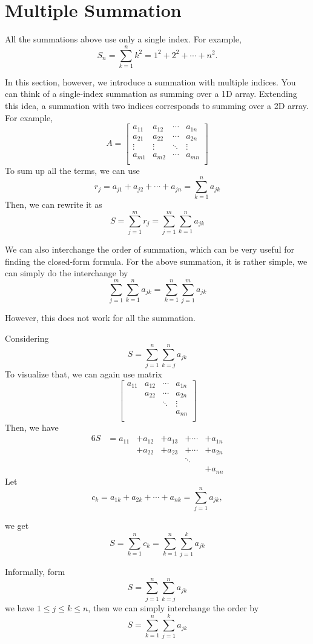 \newpage
\section{Multiple Summation}
All the summations above use only a single index. For example, 
\[
	S_n = \sum_{k = 1}^n k^2 = 1^2 + 2^2 + \cdots + n^2.
\]

In this section, however, we introduce a summation with multiple indices. You can think of a single-index summation as summing over a 1D array. Extending this idea, a summation with two indices corresponds to summing over a 2D array. For example,
\[
	A = \begin{bmatrix}
		a_{11} & a_{12} & \cdots & a_{1n}  \\
		a_{21} & a_{22} & \cdots & a_{2n}  \\
		\vdots & \vdots & \ddots & \vdots  \\
		a_{m1} & a_{m2} & \cdots & a_{mn}  \\
	\end{bmatrix}
\]
To sum up all the terms, we can use
\[
	r_j = a_{j1} + a_{j2} + \cdots + a_{jn} = \sum_{k = 1}^n a_{jk} 
\]
Then, we can rewrite it as
\[
	S = \sum_{j = 1}^m r_j = \sum_{j = 1}^m\sum_{k = 1}^n a_{jk}
\]

We can also interchange the order of summation, which can be very useful for finding the closed-form formula. For the above summation, it is rather simple, we can simply do the interchange by
\[
	\sum_{j = 1}^m\sum_{k = 1}^n a_{jk} = \sum_{k = 1}^n\sum_{j = 1}^m a_{jk}
\]

However, this does not work for all the summation.
\begin{eg}
	Considering
	\[
		S = \sum_{j = 1}^n \sum_{k = j}^n a_{jk}
	\]
	To visualize that, we can again use matrix
	\[
		\begin{bmatrix}
		a_{11} & a_{12} & \cdots & a_{1n}  \\
			& a_{22} & \cdots & a_{2n}  \\
			&	& \ddots & \vdots  \\
			& 	&	& a_{nn}  \\
		\end{bmatrix}
	\]
	Then, we have
	\begin{alignat*}{6}
		S &= a_{11} &+ a_{12} &+ a_{13} &+ \cdots &+ a_{1n} \\
		&	&+ a_{22} &+ a_{23} &+ \cdots &+ a_{2n} \\
		&	&	&	&\ddots &\\
		&	&	&	&	&+ a_{nn}
	\end{alignat*}
	Let \[
	c_k = a_{1k}  + a_{2k} + \cdots + a_{nk} = \sum_{j = 1}^n a_{jk}, \]

	we get
	\[
		S = \sum_{k = 1}^n c_k = \sum_{k = 1}^n \sum_{j = 1}^k a_{jk}
	\]
	\begin{remark}
		Informally, form
		\[
			S = \sum_{j = 1}^n \sum_{k = j}^n a_{jk}
		\]
		we have \(1 \leq j \leq k \leq n\), then we can simply interchange the order by
		\[
			S = \sum_{k = 1}^n \sum_{j = 1}^{k} a_{jk}
		\]
	\end{remark}
\end{eg}

